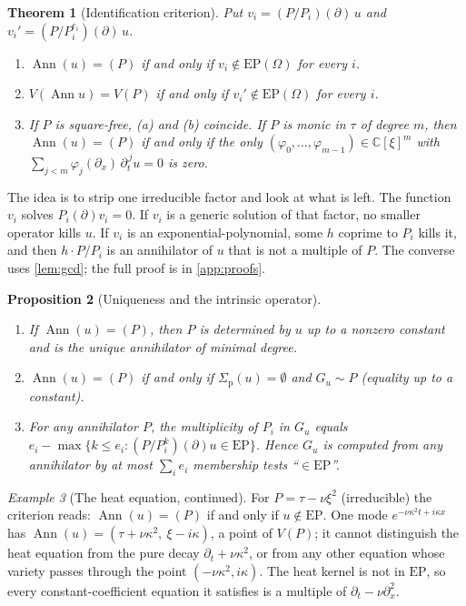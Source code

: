 \documentclass[11pt]{article}
\theoremstyle{plain}
\newtheorem{theorem}{Theorem}[section]
\newtheorem{proposition}[theorem]{Proposition}
\theoremstyle{definition}
\theoremstyle{remark}
\newtheorem{example}[theorem]{Example}
\newcommand{\C}{\mathbb{C}}
\DeclareMathOperator{\Ann}{Ann}             %
\newcommand{\Var}{V}                        %
\newcommand{\EP}{\mathrm{EP}}               %
\newcommand{\Gu}{G_u}                       %
\newcommand{\sigp}{\Sigma_{\mathrm p}}      %
\begin{document}
\begin{theorem}[Identification criterion]\label{thm:ident}
Put $v_i=(P/P_i)(\partial)\,u$ and $v_i'=(P/P_i^{e_i})(\partial)\,u$.
\begin{enumerate}[label=(\alph*)]
  \item $\Ann(u)=(P)$ if and only if $v_i\notin\EP(\Omega)$ for every $i$.
  \item $\Var(\Ann u)=\Var(P)$ if and only if $v_i'\notin\EP(\Omega)$ for every $i$.
  \item If $P$ is square-free, (a) and (b) coincide. If $P$ is monic in $\tau$ of degree $m$, then
  $\Ann(u)=(P)$ if and only if the only $(\varphi_0,\dots,\varphi_{m-1})\in\C[\xi]^m$ with
  $\sum_{j<m}\varphi_j(\partial_x)\,\partial_t^{\,j}u=0$ is zero.
\end{enumerate}
\end{theorem}

The idea is to strip one irreducible factor and look at what is left. The function $v_i$ solves
$P_i(\partial)v_i=0$. If $v_i$ is a generic solution of that factor, no smaller operator kills $u$.
If $v_i$ is an exponential-polynomial, some $h$ coprime to $P_i$ kills it, and then
$h\cdot P/P_i$ is an annihilator of $u$ that is not a multiple of $P$. The converse uses
\cref{lem:gcd}; the full proof is in \cref{app:proofs}.

\begin{proposition}[Uniqueness and the intrinsic operator]\label{prop:unique}
\begin{enumerate}[label=(\alph*)]
  \item If $\Ann(u)=(P)$, then $P$ is determined by $u$ up to a nonzero constant and is the unique
  annihilator of minimal degree.
  \item $\Ann(u)=(P)$ if and only if $\sigp(u)=\emptyset$ and $\Gu\sim P$ (equality up to a constant).
  \item For any annihilator $P$, the multiplicity of $P_i$ in $\Gu$ equals $e_i-\max\{k\le e_i:
  (P/P_i^{k})(\partial)u\in\EP\}$. Hence $\Gu$ is computed from any annihilator by at most
  $\sum_ie_i$ membership tests ``$\in\EP$''.
\end{enumerate}
\end{proposition}

\begin{example}[The heat equation, continued]\label{ex:heat-ident}
For $P=\tau-\nu\xi^2$ (irreducible) the criterion reads: $\Ann(u)=(P)$ if and only if $u\notin\EP$.
One mode $e^{-\nu\kappa^2t+i\kappa x}$ has $\Ann(u)=(\tau+\nu\kappa^2,\ \xi-i\kappa)$, a point of
$\Var(P)$; it cannot distinguish the heat equation from the pure decay $\partial_t+\nu\kappa^2$, or from
any other equation whose variety passes through the point $(-\nu\kappa^2,i\kappa)$. The heat kernel is not in $\EP$, so every
constant-coefficient equation it satisfies is a multiple of $\partial_t-\nu\partial_x^2$.
\end{example}
\end{document}
